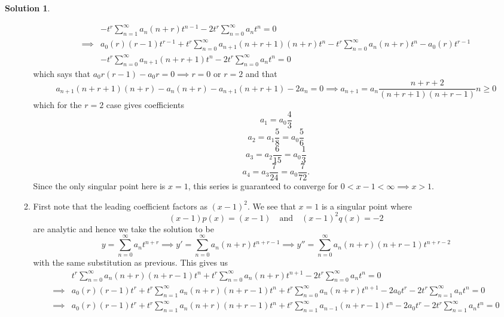 \documentclass[10pt]{article}
\theoremstyle{definition}
\newtheorem{soln}{Solution}
\begin{document}
\begin{soln}
\begin{enumerate}[label=(\alph*)]
\begin{enumerate}[label=\roman*.]
\begin{align*}
                             & -t^r\sum_{n=1}^{\infty}a_n(n+r) t^{n-1} - 2t^r\sum_{n=0}^{\infty}a_n t^{n} = 0                                                                                     \\
                    \implies & a_0(r)(r-1) t^{r-1}+t^r\sum_{n=0}^{\infty}a_{n+1}(n+r+1)(n+r) t^{n} - t^r\sum_{n=0}^{\infty}a_n(n+r) t^{n}-a_0(r) t^{r-1}                                          \\
                             & -t^r\sum_{n=0}^{\infty}a_{n+1}(n+r+1) t^{n} - 2t^r\sum_{n=0}^{\infty}a_n t^{n} = 0
                  \end{align*}
                  which says that
                  $a_0r(r-1)-a_0r=0\implies r=0\text{ or }r=2$
                  and that
                  $$a_{n+1}(n+r+1)(n+r)-a_n(n+r)-a_{n+1}(n+r+1)-2a_n = 0\implies a_{n+1}=a_n\frac{n+r+2}{(n+r+1)(n+r-1)}n\geq 0$$
                  which for the $r=2$ case gives coefficients
                  $$a_{1}=a_0\frac{4}{3}$$
                  $$a_{2}=a_1\frac{5}{8}=a_0\frac{5}{6}$$
                  $$a_{3}=a_2\frac{6}{15}=a_0\frac{1}{3}$$
                  $$a_{4}=a_3\frac{7}{24}=a_0\frac{7}{72}.$$
                  Since the only singular point here is $x=1$, this series is guaranteed to converge for $0<x-1<\infty\implies x>1$.
            \item First note that the leading coefficient factors as $(x-1)^2$. We see that $x=1$ is a singular point where
                  $$(x-1)p(x)=(x-1)\quad\text{and}\quad (x-1)^2q(x)=-2$$
                  are analytic and hence we take the solution to be
                  $$y=\sum_{n=0}^{\infty}a_n t^{n+r}\implies y'=\sum_{n=0}^{\infty}a_n(n+r) t^{n+r-1}\implies y''=\sum_{n=0}^{\infty}a_n(n+r)(n+r-1) t^{n+r-2}$$
                  with the same substitution as previous. This gives us
                  \begin{align*}
                             & t^r\sum_{n=0}^{\infty}a_n(n+r)(n+r-1) t^{n}+ t^r\sum_{n=0}^{\infty}a_n(n+r) t^{n+1} - 2t^r\sum_{n=0}^{\infty}a_n t^{n}=0                                  \\
                    \implies & a_0(r)(r-1) t^{r}+t^r\sum_{n=1}^{\infty}a_n(n+r)(n+r-1) t^{n}+ t^r\sum_{n=0}^{\infty}a_n(n+r) t^{n+1} - 2a_0 t^{r}-2t^r\sum_{n=1}^{\infty}a_n t^{n}=0     \\
                    \implies & a_0(r)(r-1) t^{r}+t^r\sum_{n=1}^{\infty}a_n(n+r)(n+r-1) t^{n}+ t^r\sum_{n=1}^{\infty}a_{n-1}(n+r-1) t^{n} - 2a_0 t^{r}-2t^r\sum_{n=1}^{\infty}a_n t^{n}=0
                  \end{align*}

\end{enumerate}
\end{enumerate}
\end{soln}
\end{document}
